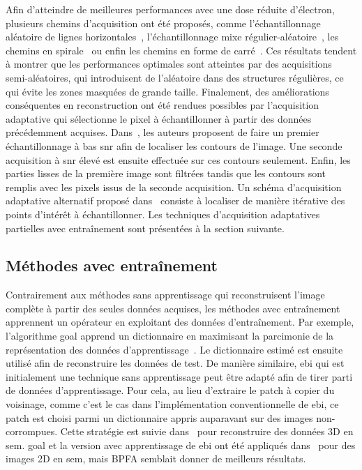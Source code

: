 Afin d'atteindre de meilleures performances avec une dose réduite d'électron, plusieurs chemins d'acquisition ont été proposés, comme l'échantillonnage aléatoire de lignes horizontales~\cite{kovarik2016implementation,han2018optimal}, l'échantillonnage mixe régulier-aléatoire~\cite{stevens2018apl}, les chemins en spirale~\cite{sang2017dynamic,li2018compressive,han2018optimal} ou enfin les chemins en forme de carré~\cite{han2018optimal}.
%
Ces résultats tendent à montrer que les performances optimales sont atteintes par des acquisitions semi-aléatoires, qui introduisent de l'aléatoire dans des structures régulières, ce qui évite les zones masquées de grande taille. %
%
Finalement, des améliorations conséquentes en reconstruction ont été rendues possibles par l'acquisition adaptative qui sélectionne le pixel à échantillonner à partir des données précédemment acquises. Dans~\cite{dahmen2016feature}, les auteurs proposent de faire un premier échantillonnage à bas \gls{snr} afin de localiser les contours de l'image. Une seconde acquisition à \gls{snr} élevé est ensuite effectuée sur ces contours seulement. Enfin, les parties lisses de la première image sont filtrées tandis que les contours sont remplis avec les pixels issus de la seconde acquisition. Un schéma d'acquisition adaptative alternatif proposé dans~\cite{dahmen2019adaptive} consiste à localiser de manière itérative des points d'intérêt à échantillonner. Les techniques d'acquisition adaptatives partielles avec entraînement sont présentées à la section suivante.

\subsection{Méthodes avec entraînement}

Contrairement aux méthodes sans apprentissage qui reconstruisent l'image complète à partir des seules données acquises, les méthodes avec entraînement apprennent un opérateur en exploitant des données d'entraînement. Par exemple, l'algorithme \gls{goal} apprend un dictionnaire en maximisant la parcimonie de la représentation des données d'apprentissage~\cite{hawe2013analysis}. Le dictionnaire estimé est ensuite utilisé afin de reconstruire les données de test. De manière similaire, \gls{ebi} qui est initialement une technique sans apprentissage peut être adapté afin de tirer parti de données d'apprentissage. Pour cela, au lieu d'extraire le patch à copier du voisinage, comme c'est le cas dans l'implémentation conventionnelle de \gls{ebi}, ce patch est choisi parmi un dictionnaire appris auparavant sur des images non-corrompues. Cette stratégie est suivie dans~\cite{trampert2018exemplar} pour reconstruire des données 3D en \gls{sem}. \gls{goal} et la version avec apprentissage de \gls{ebi} ont été appliqués dans~\cite{trampert2018ultramicroscopy} pour des images 2D en \gls{sem}, mais BPFA semblait donner de meilleurs résultats.

